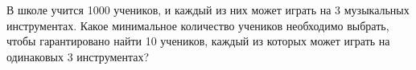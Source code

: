 \question 
В школе учится 1000 учеников, и каждый из них может играть на 3 музыкальных инструментах. Какое минимальное количество учеников необходимо выбрать, чтобы гарантировано найти 10 учеников, каждый из которых может играть на одинаковых 3 инструментах?

